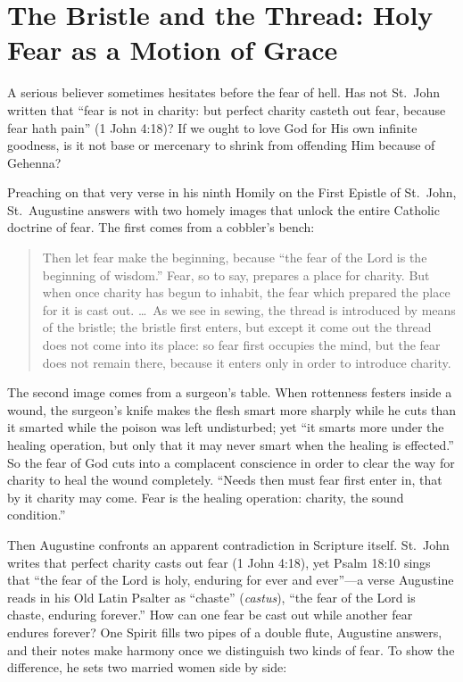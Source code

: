 \section{The Bristle and the Thread: Holy Fear as a Motion of Grace}

A serious believer sometimes hesitates before the fear of hell. Has not St.\ John written that ``fear is not in charity: but perfect charity casteth out fear, because fear hath pain'' (1 John 4:18)? If we ought to love God for His own infinite goodness, is it not base or mercenary to shrink from offending Him because of Gehenna?

Preaching on that very verse in his ninth Homily on the First Epistle of St.\ John, St.\ Augustine answers with two homely images that unlock the entire Catholic doctrine of fear. The first comes from a cobbler's bench:

\begin{quote}
Then let fear make the beginning, because ``the fear of the Lord is the beginning of wisdom.'' Fear, so to say, prepares a place for charity. But when once charity has begun to inhabit, the fear which prepared the place for it is cast out. \dots\ As we see in sewing, the thread is introduced by means of the bristle; the bristle first enters, but except it come out the thread does not come into its place: so fear first occupies the mind, but the fear does not remain there, because it enters only in order to introduce charity.
\end{quote}

The second image comes from a surgeon's table. When rottenness festers inside a wound, the surgeon's knife makes the flesh smart more sharply while he cuts than it smarted while the poison was left undisturbed; yet ``it smarts more under the healing operation, but only that it may never smart when the healing is effected.'' So the fear of God cuts into a complacent conscience in order to clear the way for charity to heal the wound completely. ``Needs then must fear first enter in, that by it charity may come. Fear is the healing operation: charity, the sound condition.''

Then Augustine confronts an apparent contradiction in Scripture itself. St.\ John writes that perfect charity casts out fear (1 John 4:18), yet Psalm 18:10 sings that ``the fear of the Lord is holy, enduring for ever and ever''---a verse Augustine reads in his Old Latin Psalter as ``chaste'' (\textit{castus}), ``the fear of the Lord is chaste, enduring forever.'' How can one fear be cast out while another fear endures forever? One Spirit fills two pipes of a double flute, Augustine answers, and their notes make harmony once we distinguish two kinds of fear. To show the difference, he sets two married women side by side:

